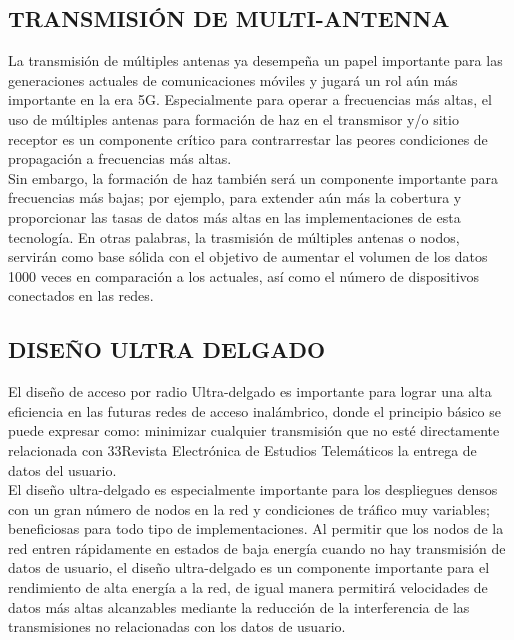 \documentclass[]{article}
\begin{document}
\subsection{TRANSMISIÓN DE MULTI-ANTENNA}
La transmisión de múltiples antenas ya desempeña un papel importante para las
generaciones actuales de comunicaciones móviles y jugará un rol aún más importante en
la era 5G. Especialmente para operar a frecuencias más altas, el uso de múltiples antenas
para formación de haz en el transmisor y/o sitio receptor es un componente crítico para
contrarrestar las peores condiciones de propagación a frecuencias más altas. \\

Sin
embargo, la formación de haz también será un componente importante para frecuencias
más bajas; por ejemplo, para extender aún más la cobertura y proporcionar las tasas de
datos más altas en las implementaciones de esta tecnología. En otras palabras, la
trasmisión de múltiples antenas o nodos, servirán como base sólida con el objetivo de
aumentar el volumen de los datos 1000 veces en comparación a los actuales, así como el
número de dispositivos conectados en las redes.\\

\subsection{DISEÑO ULTRA DELGADO}
El diseño de acceso por radio Ultra-delgado es importante para lograr una alta
eficiencia en las futuras redes de acceso inalámbrico, donde el principio básico se puede
expresar como: minimizar cualquier transmisión que no esté directamente relacionada con
33Revista Electrónica de
Estudios Telemáticos
la entrega de datos del usuario.\\

 El diseño ultra-delgado es especialmente importante para
los despliegues densos con un gran número de nodos en la red y condiciones de tráfico
muy variables; beneficiosas para todo tipo de implementaciones.
Al permitir que los nodos de la red entren rápidamente en estados de baja energía
cuando no hay transmisión de datos de usuario, el diseño ultra-delgado es un
componente importante para el rendimiento de alta energía a la red, de igual manera
permitirá velocidades de datos más altas alcanzables mediante la reducción de la
interferencia de las transmisiones no relacionadas con los datos de usuario.\\
\end{document}
